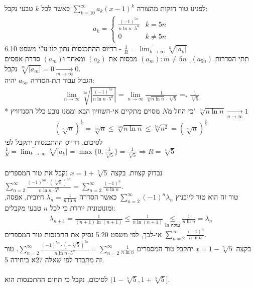 \documentclass{article}
\newcommand\underrel[2]{\mathrel{\mathop{#2}\limits_{#1}}}
\DeclareMathOperator*{\equals}{=}
\begin{document}
            לפנינו טור חזקות מהצורה $\sum_{k=10}^\infty a_k(x-1)^k$ כאשר לכל $k$ טבעי נקבל:
            \begin{align*}
                a_k=\begin{cases}
                    \frac{(-1)^{5n}}{n\ln n\cdot 5^n} & k=5n    \\
                    0                                 & k\ne 5n
                \end{cases}
            \end{align*}
            רדיוס ההתכנסות נתון לנו ע"י משפט 6.10 - $\frac{1}{R}=\overline{\lim_{k\rightarrow\infty}}\sqrt[k]{|a_k|}$ \\
            תתי הסדרות $(a_{5n})$, $(a_m): m\ne 5n$ מכסות את $(a_k)$ ומאחר ו$(a_m)$ סדרת אפסים נקבל $\sqrt[m]{|a_m|}=0\xrightarrow[m\rightarrow\infty]{}0$. \\
            הגבול עבור תת-הסדרה $a_{5n}$ יהיה:
            \begin{align*}
                \lim_{n\rightarrow\infty} \sqrt[5n]{\left|\frac{(-1)^{5n}}{n\ln n\cdot 5^n}\right|}=
                \lim_{n\rightarrow\infty} \frac{1}{\sqrt[5n]{n\ln n}\cdot \sqrt[5]{5}}\equals_\ast\frac{1}{\sqrt[5]{5}}
            \end{align*}
            * כי החל מ$N$ מסוים מתקיים אי-השוויון הבא וממנו נובע כלל הסנדוויץ' $\sqrt[5n]{n\ln n}\xrightarrow[n\rightarrow\infty]{}1$
            \begin{align*}
                (\sqrt[n]{n})^\frac{1}{5}= \sqrt[5n]{n} \leq \sqrt[5n]{n\ln n} \leq \sqrt[5n]{n^2} = (\sqrt[n]{n})^\frac{2}{5}
            \end{align*}
            לסיכום, רדיוס ההתכנסות יתקבל לפי $\frac{1}{R}=\overline{\lim_{k\rightarrow\infty}}\sqrt[k]{|a_k|}=\max\{ 0, \frac{1}{\sqrt[5]{5}} \}=\frac{1}{\sqrt[5]{5}}\Rightarrow R=\sqrt[5]{5}$ \\\\
            נבדוק קצוות. בקצה $x=1+\sqrt[5]{5}$ נקבל את טור המספרים $\sum_{n=2}^\infty \frac{(-1)^{5n} \cdot (\sqrt[5]{5})^{5n}}{n\ln n \cdot 5^n} = \sum_{n=2}^\infty \frac{(-1)^n}{n\ln n}$. \\
            טור זה הוא טור לייבניץ $\sum_{n=2}^\infty (-1)^n \lambda_n$ כאשר הסדרה $\lambda_n=\frac{1}{n\ln n}$ חיובית, אפסה, ומונוטונית יורדת כי לכל $n$ טבעי מקבלים:
            \begin{align*}
                \lambda_{n+1}=\frac{1}{(n+1)\ln(n+1)}\leq
                \frac{1}{n\ln(n+1)} \underrel{\text{ln עולה}}{\leq}
                \frac{1}{n\ln n}=\lambda_n
            \end{align*}
            אי-לכך, לפי משפט 5.20 נסיק את התכנסות טור המספרים $\sum_{n=2}^\infty \frac{(-1)^n}{n\ln n}$.\\
            בקצה $x=1-\sqrt[5]{5}$ יתקבל טור המספרים $\sum_{n=2}^\infty \frac{(-1)^{5n} \cdot (-\sqrt[5]{5})^{5n}}{n\ln n \cdot 5^n}=\sum_{n=2}^\infty \frac{1}{n\ln n}$. טור זה מתבדר לפי שאלה $27$א ביחידה 5.\\\\
            לסיכום, נקבל כי תחום ההתכנסות הוא $(1-\sqrt[5]{5}, 1+\sqrt[5]{5}]$.
\end{document}
